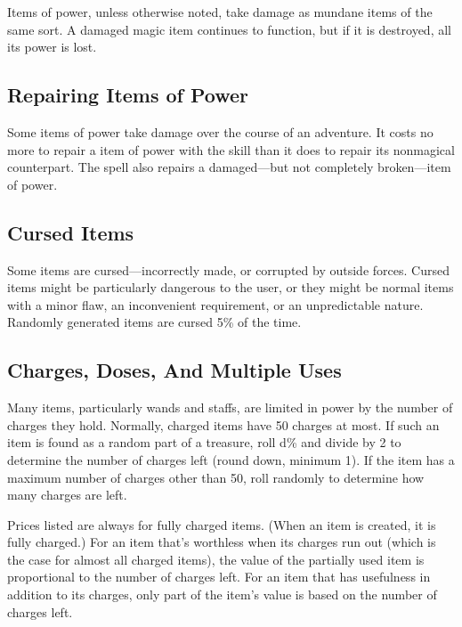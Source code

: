 Items of power, unless otherwise noted, take damage as mundane items of the same sort. A damaged magic item continues to function, but if it is destroyed, all its power is lost.

\subsection{Repairing Items of Power}
Some items of power take damage over the course of an adventure. It costs no more to repair a item of power with the  skill than it does to repair its nonmagical counterpart. The  spell also repairs a damaged---but not completely broken---item of power.



\subsection{Cursed Items}
Some items are cursed---incorrectly made, or corrupted by outside forces. Cursed items might be particularly dangerous to the user, or they might be normal items with a minor flaw, an inconvenient requirement, or an unpredictable nature. Randomly generated items are cursed 5\% of the time.

\subsection{Charges, Doses, And Multiple Uses}
Many items, particularly wands and staffs, are limited in power by the number of charges they hold. Normally, charged items have 50 charges at most. If such an item is found as a random part of a treasure, roll d\% and divide by 2 to determine the number of charges left (round down, minimum 1). If the item has a maximum number of charges other than 50, roll randomly to determine how many charges are left.

Prices listed are always for fully charged items. (When an item is created, it is fully charged.) For an item that's worthless when its charges run out (which is the case for almost all charged items), the value of the partially used item is proportional to the number of charges left. For an item that has usefulness in addition to its charges, only part of the item's value is based on the number of charges left.